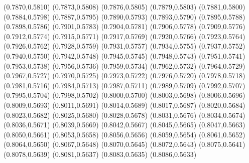 \PST@Filltriangle(0.7870,0.5810)
\PST@Filltriangle(0.7873,0.5808)
\PST@Filltriangle(0.7876,0.5805)
\PST@Filltriangle(0.7879,0.5803)
\PST@Filltriangle(0.7881,0.5800)
\PST@Filltriangle(0.7884,0.5798)
\PST@Filltriangle(0.7887,0.5795)
\PST@Filltriangle(0.7890,0.5793)
\PST@Filltriangle(0.7893,0.5790)
\PST@Filltriangle(0.7895,0.5788)
\PST@Filltriangle(0.7898,0.5786)
\PST@Filltriangle(0.7901,0.5783)
\PST@Filltriangle(0.7904,0.5781)
\PST@Filltriangle(0.7906,0.5778)
\PST@Filltriangle(0.7909,0.5776)
\PST@Filltriangle(0.7912,0.5774)
\PST@Filltriangle(0.7915,0.5771)
\PST@Filltriangle(0.7917,0.5769)
\PST@Filltriangle(0.7920,0.5766)
\PST@Filltriangle(0.7923,0.5764)
\PST@Filltriangle(0.7926,0.5762)
\PST@Filltriangle(0.7928,0.5759)
\PST@Filltriangle(0.7931,0.5757)
\PST@Filltriangle(0.7934,0.5755)
\PST@Filltriangle(0.7937,0.5752)
\PST@Filltriangle(0.7940,0.5750)
\PST@Filltriangle(0.7942,0.5748)
\PST@Filltriangle(0.7945,0.5745)
\PST@Filltriangle(0.7948,0.5743)
\PST@Filltriangle(0.7951,0.5741)
\PST@Filltriangle(0.7953,0.5738)
\PST@Filltriangle(0.7956,0.5736)
\PST@Filltriangle(0.7959,0.5734)
\PST@Filltriangle(0.7962,0.5732)
\PST@Filltriangle(0.7964,0.5729)
\PST@Filltriangle(0.7967,0.5727)
\PST@Filltriangle(0.7970,0.5725)
\PST@Filltriangle(0.7973,0.5722)
\PST@Filltriangle(0.7976,0.5720)
\PST@Filltriangle(0.7978,0.5718)
\PST@Filltriangle(0.7981,0.5716)
\PST@Filltriangle(0.7984,0.5713)
\PST@Filltriangle(0.7987,0.5711)
\PST@Filltriangle(0.7989,0.5709)
\PST@Filltriangle(0.7992,0.5707)
\PST@Filltriangle(0.7995,0.5704)
\PST@Filltriangle(0.7998,0.5702)
\PST@Filltriangle(0.8000,0.5700)
\PST@Filltriangle(0.8003,0.5698)
\PST@Filltriangle(0.8006,0.5696)
\PST@Filltriangle(0.8009,0.5693)
\PST@Filltriangle(0.8011,0.5691)
\PST@Filltriangle(0.8014,0.5689)
\PST@Filltriangle(0.8017,0.5687)
\PST@Filltriangle(0.8020,0.5684)
\PST@Filltriangle(0.8023,0.5682)
\PST@Filltriangle(0.8025,0.5680)
\PST@Filltriangle(0.8028,0.5678)
\PST@Filltriangle(0.8031,0.5676)
\PST@Filltriangle(0.8034,0.5674)
\PST@Filltriangle(0.8036,0.5671)
\PST@Filltriangle(0.8039,0.5669)
\PST@Filltriangle(0.8042,0.5667)
\PST@Filltriangle(0.8045,0.5665)
\PST@Filltriangle(0.8047,0.5663)
\PST@Filltriangle(0.8050,0.5661)
\PST@Filltriangle(0.8053,0.5658)
\PST@Filltriangle(0.8056,0.5656)
\PST@Filltriangle(0.8059,0.5654)
\PST@Filltriangle(0.8061,0.5652)
\PST@Filltriangle(0.8064,0.5650)
\PST@Filltriangle(0.8067,0.5648)
\PST@Filltriangle(0.8070,0.5645)
\PST@Filltriangle(0.8072,0.5643)
\PST@Filltriangle(0.8075,0.5641)
\PST@Filltriangle(0.8078,0.5639)
\PST@Filltriangle(0.8081,0.5637)
\PST@Filltriangle(0.8083,0.5635)
\PST@Filltriangle(0.8086,0.5633)
